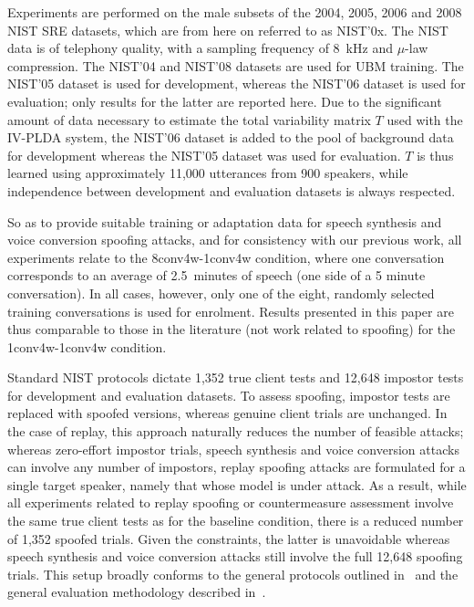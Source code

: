 
Experiments are performed on the male subsets of the 2004, 2005, 2006 and 2008 NIST SRE datasets, which are from here on referred to as NIST'0x.  The NIST data is of telephony quality, with a sampling frequency of 8~kHz and $\mu$-law compression.
The NIST'04 and NIST'08 datasets are used for UBM training.
The NIST'05 dataset is used for development, whereas the NIST'06 dataset is used for evaluation;  
only results for the latter are reported here.
Due to the significant amount of data necessary to estimate the total variability matrix $T$ used with the IV-PLDA system, the NIST'06 dataset is added to the pool of background data for development whereas the NIST'05 dataset was used for evaluation. 
$T$ is thus learned using approximately 11,000 utterances from 900 speakers, while independence between development and evaluation datasets is always respected.
 
So as to provide suitable training or adaptation data for speech synthesis and voice conversion spoofing attacks, and for consistency with our previous work, all experiments relate to the 8conv4w-1conv4w condition, where one conversation corresponds to an average of 2.5~minutes of speech (one side of a 5 minute conversation).
In all cases, however, only one of the eight, randomly selected training conversations is used for enrolment. 
Results presented in this paper are thus comparable to those in the literature (not work related to spoofing) for the 1conv4w-1conv4w condition. 

Standard NIST protocols dictate 1,352 true client tests and 12,648 impostor tests for development and evaluation datasets. 
To assess spoofing, impostor tests are replaced with spoofed versions, whereas genuine client trials are unchanged.
In the case of replay, this approach naturally reduces the number of feasible attacks; whereas zero-effort impostor trials, speech synthesis and voice conversion attacks can involve any number of impostors, replay spoofing attacks are formulated for a single target speaker, namely that whose model is under attack.  As a result, while all experiments related to replay spoofing or countermeasure assessment involve the same true client tests as for the baseline condition, there is a reduced number of 1,352 spoofed trials.  Given the constraints, the latter is unavoidable whereas speech synthesis and voice conversion attacks still involve the full 12,648 spoofing trials.  This setup broadly conforms to the general protocols outlined in~\cite{Wu2014a,Wu2015} and the general evaluation methodology described in~\cite{Hadid2015}.


